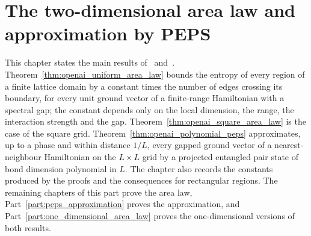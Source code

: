 \chapter{The two-dimensional area law and approximation by PEPS}
\label{ch:two_dimensional_main_results}

This chapter states the main results of~\cite{OpenAI2026AreaLaw}
and~\cite{OpenAI2026PolynomialPEPS}. Theorem~\ref{thm:openai_uniform_area_law}
bounds the entropy of every region of a finite lattice domain by a constant
times the number of edges crossing its boundary, for every unit ground vector
of a finite-range Hamiltonian with a spectral gap; the constant depends only
on the local dimension, the range, the interaction strength and the gap.
Theorem~\ref{thm:openai_square_area_law} is the case of the square grid.
Theorem~\ref{thm:openai_polynomial_peps} approximates, up to a phase and within
distance $1/L$, every gapped ground vector of a nearest-neighbour Hamiltonian
on the $L\times L$ grid by a projected entangled pair state of bond dimension
polynomial in $L$. The chapter also records the constants produced by the
proofs and the consequences for rectangular regions.
The remaining chapters of this part prove the area law,
Part~\ref{part:peps_approximation} proves the approximation, and
Part~\ref{part:one_dimensional_area_law} proves the one-dimensional versions of
both results.





